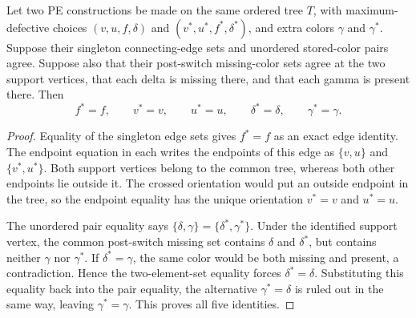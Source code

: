 \begin{helper}
Let two PE constructions be made on the same ordered tree \(T\), with
maximum-defective choices
\((v,u,f,\delta)\) and \((v^*,u^*,f^*,\delta^*)\), and extra colors
\(\gamma\) and \(\gamma^*\).  Suppose their singleton connecting-edge
sets and unordered stored-color pairs agree.  Suppose also that their
post-switch missing-color sets agree at the two support vertices, that each
delta is missing there, and that each gamma is present there.  Then
\[
 f^*=f,\qquad v^*=v,\qquad u^*=u,\qquad
 \delta^*=\delta,\qquad\gamma^*=\gamma .
\]
\end{helper}
\begin{proof}
Equality of the singleton edge sets gives \(f^*=f\) as an exact edge
identity.  The endpoint equation in each
 writes the endpoints of this edge as
\(\{v,u\}\) and \(\{v^*,u^*\}\).  Both support vertices belong to
the common tree, whereas both other endpoints lie outside it.  The crossed
orientation would put an outside endpoint in the tree, so the endpoint
equality has the unique orientation \(v^*=v\) and \(u^*=u\).

The unordered pair equality says
\(\{\delta,\gamma\}=\{\delta^*,\gamma^*\}\).
Under the identified support vertex, the common post-switch missing set
contains \(\delta\) and \(\delta^*\), but contains neither
\(\gamma\) nor \(\gamma^*\).  If \(\delta^*=\gamma\), the same
color would be both missing and present, a contradiction.  Hence the
two-element-set equality forces \(\delta^*=\delta\).  Substituting this
equality back into the pair equality, the alternative
\(\gamma^*=\delta\) is ruled out in the same way, leaving
\(\gamma^*=\gamma\).  This proves all five identities.
\end{proof}

